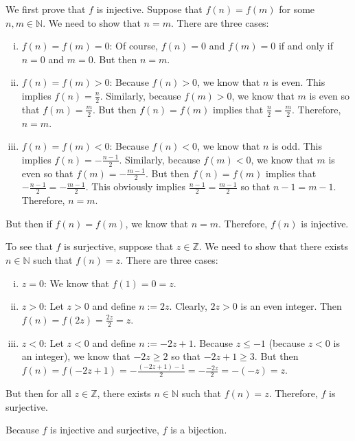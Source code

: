 \documentclass[11pt,letterpaper]{article}
\begin{document}
\begin{enumerate}[(a)]
\pspace

We first prove that $f$ is injective. Suppose that $f(n)= f(m)$ for some $n, m \in \mathbb{N}$. We need to show that $n= m$. There are three cases:
	\begin{enumerate}[(i)]
	\item $f(n)= f(m)= 0$: Of course, $f(n)= 0$ and $f(m)= 0$ if and only if $n= 0$ and $m= 0$. But then $n= m$. 
	\item $f(n)= f(m) > 0$: Because $f(n) > 0$, we know that $n$ is even. This implies $f(n)= \frac{n}{2}$. Similarly, because $f(m) > 0$, we know that $m$ is even so that $f(m)= \frac{m}{2}$. But then $f(n)= f(m)$ implies that $\frac{n}{2}= \frac{m}{2}$. Therefore, $n= m$. 
	\item $f(n)= f(m) < 0$: Because $f(n) < 0$, we know that $n$ is odd. This implies $f(n)= -\frac{n - 1}{2}$. Similarly, because $f(m) < 0$, we know that $m$ is even so that $f(m)= -\frac{m - 1}{2}$. But then $f(n)= f(m)$ implies that $-\frac{n - 1}{2}= -\frac{m - 1}{2}$. This obviously implies $\frac{n - 1}{2}= \frac{m - 1}{2}$ so that $n - 1= m - 1$. Therefore, $n= m$. 
	\end{enumerate}
But then if $f(n)= f(m)$, we know that $n= m$. Therefore, $f(n)$ is injective. \pspace

To see that $f$ is surjective, suppose that $z \in \mathbb{Z}$. We need to show that there exists $n \in \mathbb{N}$ such that $f(n)= z$. There are three cases:
	\begin{enumerate}[(i)]
	\item $z= 0$: We know that $f(1)= 0= z$.
	\item $z > 0$: Let $z > 0$ and define $n:= 2z$. Clearly, $2z > 0$ is an even integer. Then $f(n)= f(2z)= \frac{2z}{2}= z$.
	
	\item $z < 0$: Let $z < 0$ and define $n:= -2z + 1$. Because $z \leq -1$ (because $z < 0$ is an integer), we know that $-2z \geq 2$ so that $-2z + 1 \geq 3$. But then $f(n)= f(-2z + 1)= -\frac{(-2z + 1) - 1}{2}= -\frac{-2z}{2}= -(-z)= z$.
	\end{enumerate}
But then for all $z \in \mathbb{Z}$, there exists $n \in \mathbb{N}$ such that $f(n)= z$. Therefore, $f$ is surjective. \pspace

Because $f$ is injective and surjective, $f$ is a bijection. 
\end{enumerate}
\end{document}
